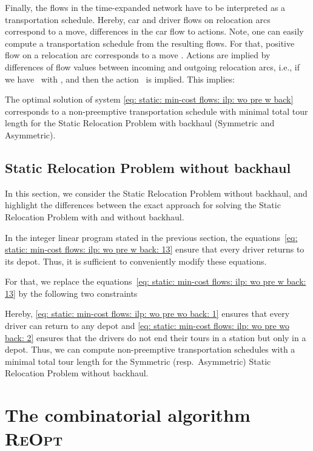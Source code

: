 \documentclass[english]{llncs}
\numberwithin{sublemma}{lemma}
\newcommand{\REOPT}{\textsc{ReOpt}\xspace}
\begin{document}
Finally, the flows in the time-expanded network have to be interpreted as a transportation schedule.
Hereby, car and driver flows on relocation arcs correspond to a move, differences in the car flow to actions.
Note, one can easily compute a transportation schedule from the resulting flows.
For that, positive flow  on a relocation arc  corresponds to a move .
Actions are implied by differences of flow values between incoming and outgoing relocation arcs, i.e., if we have~ with ,
and  then the action~ is implied.
This implies:


\begin{theorem}
The optimal solution of system \eqref{eq: static: min-cost flows: ilp: wo pre w back} corresponds to a non-preemptive transportation schedule with minimal total tour length
for the Static Relocation Problem with backhaul  (Symmetric and Asymmetric).
\end{theorem}




\subsection{Static Relocation Problem without backhaul}
\label{sec: static: min-cost flows: without backhaul}


In this section, we consider the Static Relocation Problem without backhaul, and
highlight the differences between the exact approach for solving the Static Relocation Problem with and without backhaul.

In the integer linear program stated in the previous section, the equations~\eqref{eq: static: min-cost flows: ilp: wo pre w back: 13} ensure that every driver returns to its depot.
Thus, it is sufficient to conveniently modify these equations.

For that, we replace the equations~\eqref{eq: static: min-cost flows: ilp: wo pre w back: 13} by the following two constraints

Hereby, \eqref{eq: static: min-cost flows: ilp: wo pre wo back: 1} ensures that every driver can return to any depot
and \eqref{eq: static: min-cost flows: ilp: wo pre wo back: 2} ensures that the drivers do not end their tours in a station but only in a depot.
Thus, we can compute non-preemptive transportation schedules with a minimal total tour length for the Symmetric (resp.~Asymmetric) Static Relocation Problem without backhaul.




\section{The combinatorial algorithm \REOPT}
\label{sec: static: reopt}
\end{document}
